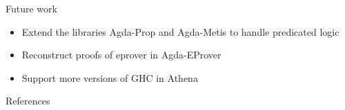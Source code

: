 \documentclass[hyperref={pdfpagelabels=false}]{beamer}
\begin{document}

\begin{frame}{Future work}

  \begin{itemize}
  \item
    Extend the libraries Agda-Prop and Agda-Metis to handle predicated logic
  \item
    Reconstruct proofs of eprover in Agda-EProver
  \item
    Support more versions of GHC in Athena
  \end{itemize}

\end{frame}


\begin{frame}{References}

\end{frame}
\end{document}
